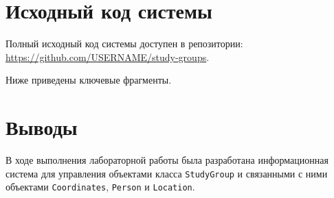\documentclass[a4paper,12pt]{article}
\newcommand{\repourl}{https://github.com/USERNAME/study-groups}
\begin{document}
\newpage
\section{Исходный код системы}

Полный исходный код системы доступен в репозитории: \url{\repourl}.

Ниже приведены ключевые фрагменты.





















\newpage
\section{Выводы}

В ходе выполнения лабораторной работы была разработана информационная система для управления объектами класса \texttt{StudyGroup} и связанными с ними объектами \texttt{Coordinates}, \texttt{Person} и \texttt{Location}.
\end{document}
